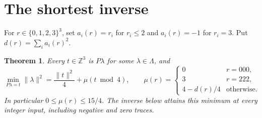 \documentclass[10pt,reqno]{amsart}
\newtheorem{theorem}{Theorem}
\theoremstyle{remark}\newtheorem{remark}[theorem]{Remark}
\newcommand{\Z}{\mathbb Z}\newcommand{\Q}{\mathbb Q}\newcommand{\R}{\mathbb R}\newcommand{\F}{\mathbb F}
\newcommand{\La}{\Lambda}\newcommand{\tr}{\operatorname{tr}}
\begin{document}
\section{The shortest inverse}
For $r\in\{0,1,2,3\}^3$, set $a_i(r)=r_i$ for $r_i\le2$ and $a_i(r)=-1$ for $r_i=3$. Put $d(r)=\sum_i a_i(r)^2$.
\begin{theorem}\label{thm:shortest}
Every $t\in\Z^3$ is $P\lambda$ for some $\lambda\in\La$, and
\[
\boxed{\min_{P\lambda=t}\|\lambda\|^2
=\frac{\|t\|^2}{4}+\mu(t\bmod4),}
\qquad
\mu(r)=\begin{cases}
0&r=000,\\
3&r=222,\\
4-d(r)/4&\text{otherwise}.
\end{cases}
\]
In particular $0\le\mu(r)\le15/4$. The inverse below attains this minimum at every integer input, including negative and zero traces.
\end{theorem}
\end{document}
